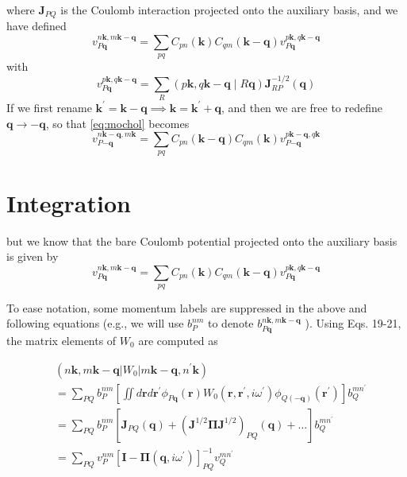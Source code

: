 \documentclass[12pt]{article}
\begin{document}
where $\mathbf{J}_{PQ}$ is the Coulomb interaction projected onto the auxiliary basis, and we have defined
\begin{equation}
    v_{P\mathbf{q}}^{n \mathbf{k}, m \mathbf{k}-\mathbf{q}} = \sum_{pq} C_{pn}(\mathbf{k}) C_{qm}(\mathbf{k}-\mathbf{q}) v_{P\mathbf{q}}^{p\mathbf{k}, q\mathbf{k}-\mathbf{q}}
\label{eq:mochol}
\end{equation}
with
\begin{equation}
    v_{P\mathbf{q}}^{p\mathbf{k}, q\mathbf{k}-\mathbf{q}} = \sum_R (p\mathbf{k}, q\mathbf{k}-\mathbf{q} \mid R\mathbf{q}) \mathbf{J}_{RP}^{-1/2}(\mathbf{q})
\end{equation}
If we first rename $\mathbf{k^\prime} = \mathbf{k}-\mathbf{q} \implies \mathbf{k} = \mathbf{k^\prime} + \mathbf{q}$, and then we are free to redefine $\mathbf{q} \rightarrow -\mathbf{q}$, so that \ref{eq:mochol} becomes
\begin{equation}
    v_{P\mathbf{-q}}^{n \mathbf{k}-\mathbf{q}, m \mathbf{k}} = \sum_{pq} C_{pn}(\mathbf{k}-\mathbf{q}) C_{qm}(\mathbf{k}) v_{P\mathbf{-q}}^{p\mathbf{k}-\mathbf{q}, q\mathbf{k}}
\end{equation}
\section{Integration}
but we know that the bare Coulomb potential projected onto the auxiliary basis is given by
\begin{equation}
    v_{P\mathbf{q}}^{n\mathbf{k}, m\mathbf{k}-\mathbf{q}} = \sum_{pq} C_{pn}(\mathbf{k}) C_{qm}(\mathbf{k}-\mathbf{q}) v_{P\mathbf{q}}^{p\mathbf{k}, q\mathbf{k}-\mathbf{q}}
\end{equation}

To ease notation, some momentum labels are suppressed in the above and following equations (e.g., we will use $b_{P}^{n m}$ to denote $b_{P \mathbf{q}}^{n \mathbf{k}, m \mathbf{k}-\mathbf{q}}$ ). Using Eqs. 19-21, the matrix elements of $W_{0}$ are computed as

\begin{align*}
& \left(n \mathbf{k}, m \mathbf{k}-\mathbf{q}\left|W_{0}\right| m \mathbf{k}-\mathbf{q}, n^{\prime} \mathbf{k}\right) \\
& =\sum_{P Q} b_{P}^{n m}\left[\iint d \mathbf{r} d \mathbf{r}^{\prime} \phi_{P \mathbf{q}}(\mathbf{r}) W_{0}\left(\mathbf{r}, \mathbf{r}^{\prime}, i \omega^{\prime}\right) \phi_{Q(-\mathbf{q})}\left(\mathbf{r}^{\prime}\right)\right] b_{Q}^{m n^{\prime}} \\
& =\sum_{P Q} b_{P}^{n m}\left[\mathbf{J}_{P Q}(\mathbf{q})+\left(\mathbf{J}^{1 / 2} \boldsymbol{\Pi} \mathbf{J}^{1 / 2}\right)_{P Q}(\mathbf{q})+\ldots\right] b_{Q}^{m n^{\prime}}  \tag{22}\\
& =\sum_{P Q} v_{P}^{n m}\left[\mathbf{I}-\mathbf{\Pi}\left(\mathbf{q}, i \omega^{\prime}\right)\right]_{P Q}^{-1} v_{Q}^{m n^{\prime}}
\end{align*}
\end{document}
